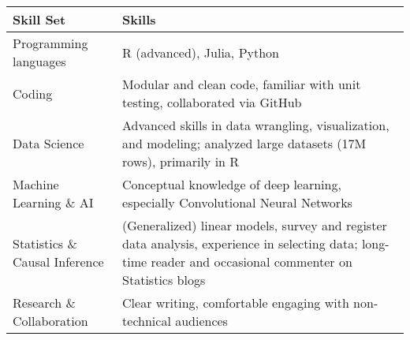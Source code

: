 

\begin{tabular}{p{}p{}}
  \textbf{Skill Set}  & \textbf{Skills} \\\hline\hline
  Programming languages & R (advanced), Julia, Python\\
  Coding & Modular and clean code, familiar with unit testing, collaborated via GitHub \\
  Data Science & Advanced skills in data wrangling, visualization, and modeling; analyzed large datasets (17M rows), primarily in R\\
  Machine Learning \& AI & Conceptual knowledge of deep learning, especially Convolutional Neural Networks \\
  Statistics \& Causal Inference & (Generalized) linear models, survey and register data analysis, experience in selecting data; long-time reader and occasional commenter on Statistics blogs\\
  Research \& Collaboration  & Clear writing, comfortable engaging with non-technical audiences\\\hline\hline
\end{tabular}\\
